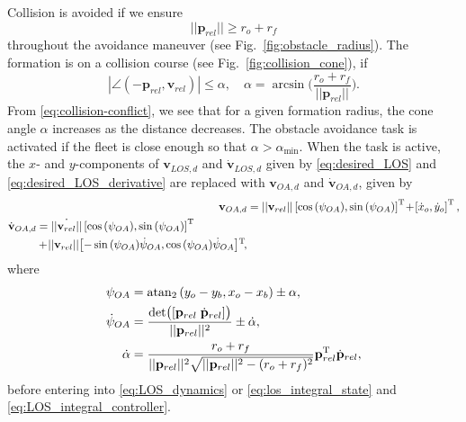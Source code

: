 Collision is avoided if we ensure
\begin{equation}
    ||\mathbf{p}_{rel}|| \geq r_o + r_f
    \label{eq:obstacle_avoidance_condition}
\end{equation}
throughout the avoidance maneuver (see Fig.~\ref{fig:obstacle_radius}). The formation is on a collision course (see Fig.~\ref{fig:collision_cone}), if
\begin{equation}
    |\angle (-\mathbf{p}_{rel}, \mathbf{v}_{rel})| \leq \alpha ,\quad \alpha = \arcsin\bigl(\frac{r_o+r_f}{||\mathbf{p}_{rel}||}\bigr).
    \label{eq:collision-conflict}
\end{equation}
From \eqref{eq:collision-conflict}, we see that for a given formation radius, the cone angle $\alpha$ increases as the distance decreases. The obstacle avoidance task is activated if the fleet is close enough so that $\alpha > \alpha_{\min}$. When the task is active, the $x$- and $y$-components of  $\mathbf{v}_{LOS,d}$ and $\dot{\mathbf{v}}_{LOS,d}$  given by \eqref{eq:desired_LOS} and \eqref{eq:desired_LOS_derivative} are replaced with $\mathbf{v}_{OA,d}$ and $\dot{\mathbf{v}}_{OA,d}$, given by
\begin{align}
    \mathbf{v}_{OA,d} &= ||\mathbf{v}_{rel}|| \left[\cos{(\psi_{OA})}, \sin{(\psi_{OA})}\right]^{\rm T} \!+\! \left[\dot{x}_o, \dot{y}_o \right]^{\rm T},\label{eq:v_OA}\\
    \begin{split}\label{eq:v_OA_dot}
    \dot{\mathbf{v}}_{OA,d} &= \dot{||\mathbf{v}_{rel}||}\left[ \cos{(\psi_{OA})}, \sin{(\psi_{OA})}\right]^{\rm T} \\&+ \!||\mathbf{v}_{rel}||\!\left[ -\sin{(\psi_{OA})}\dot{\psi}_{OA}, \cos{(\psi_{OA})} \dot{\psi}_{OA}\right]\!^{\rm T}\!,
    \end{split}
\end{align}
where
\begin{align}
    \psi_{OA} &= \mathrm{atan}_2 \left(y_o-y_b, x_o-x_b\right) \pm \alpha,\\
    \dot{\psi}_{OA} &= \frac{\mathrm{det}\bigl([\mathbf{p}_{rel}\; \dot{\mathbf{p}}_{rel}]\bigr)}{||\mathbf{p}_{rel}||^2} \pm \dot{\alpha},\\
    \dot{\alpha} &= \frac{r_o+r_f}{||\mathbf{p}_{rel}||^2\sqrt{||\mathbf{p}_{rel}||^2-(r_o+r_f)^2}}\mathbf{p}_{rel}^{\rm T} \dot{\mathbf{p}}_{rel},
\end{align}
 before entering into \eqref{eq:LOS_dynamics} or \eqref{eq:los_integral_state} and \eqref{eq:LOS_integral_controller}.

